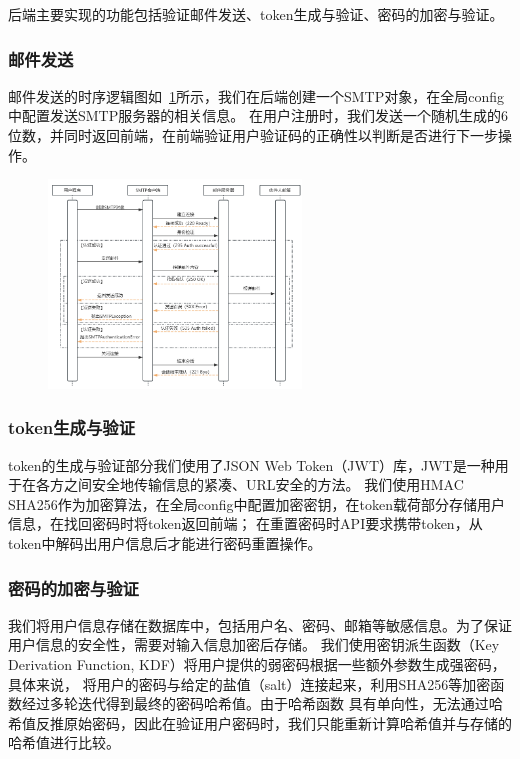 后端主要实现的功能包括验证邮件发送、token生成与验证、密码的加密与验证。

\subsubsection{邮件发送}
邮件发送的时序逻辑图如~\ref{fig:SMTP-sequence}所示，我们在后端创建一个SMTP对象，在全局config中配置发送SMTP服务器的相关信息。
在用户注册时，我们发送一个随机生成的6位数，并同时返回前端，在前端验证用户验证码的正确性以判断是否进行下一步操作。

\begin{figure}[ht]
    \centering
    \includegraphics[width=0.6\textwidth]{source/img/SMTP_sequence.png}
    \label{fig:SMTP-sequence}
\end{figure}

\subsubsection{token生成与验证}
token的生成与验证部分我们使用了JSON Web Token（JWT）库，JWT是一种用于在各方之间安全地传输信息的紧凑、URL安全的方法。
我们使用HMAC SHA256作为加密算法，在全局config中配置加密密钥，在token载荷部分存储用户信息，在找回密码时将token返回前端；
在重置密码时API要求携带token，从token中解码出用户信息后才能进行密码重置操作。

\subsubsection{密码的加密与验证}

我们将用户信息存储在数据库中，包括用户名、密码、邮箱等敏感信息。为了保证用户信息的安全性，需要对输入信息加密后存储。
我们使用密钥派生函数（Key Derivation Function, KDF）将用户提供的弱密码根据一些额外参数生成强密码，具体来说，
将用户的密码与给定的盐值（salt）连接起来，利用SHA256等加密函数经过多轮迭代得到最终的密码哈希值。由于哈希函数
具有单向性，无法通过哈希值反推原始密码，因此在验证用户密码时，我们只能重新计算哈希值并与存储的哈希值进行比较。

